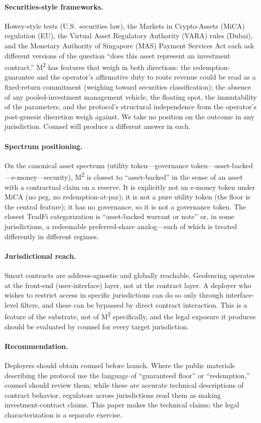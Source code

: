 \paragraph{Securities-style frameworks.} Howey-style tests (U.S.\ securities law), the Markets in Crypto-Assets (MiCA) regulation (EU), the Virtual Asset Regulatory Authority (VARA) rules (Dubai), and the Monetary Authority of Singapore (MAS) Payment Services Act each ask different versions of the question ``does this asset represent an investment contract.'' M\textsuperscript{2} has features that weigh in both directions: the redemption-guarantee and the operator's affirmative duty to route revenue could be read as a fixed-return commitment (weighing toward securities classification); the absence of any pooled-investment management vehicle, the floating spot, the immutability of the parameters, and the protocol's structural independence from the operator's post-genesis discretion weigh against. We take no position on the outcome in any jurisdiction. Counsel will produce a different answer in each.

\paragraph{Spectrum positioning.} On the canonical asset spectrum (utility token---governance token---asset-backed---e-money---security), M\textsuperscript{2} is closest to ``asset-backed'' in the sense of an asset with a contractual claim on a reserve. It is explicitly not an e-money token under MiCA (no peg, no redemption-at-par); it is not a pure utility token (the floor is the central feature); it has no governance, so it is not a governance token. The closest TradFi categorization is ``asset-backed warrant or note'' or, in some jurisdictions, a redeemable preferred-share analog---each of which is treated differently in different regimes.

\paragraph{Jurisdictional reach.} Smart contracts are address-agnostic and globally reachable. Geofencing operates at the front-end (user-interface) layer, not at the contract layer. A deployer who wishes to restrict access in specific jurisdictions can do so only through interface-level filters, and these can be bypassed by direct contract interaction. This is a feature of the substrate, not of M\textsuperscript{2} specifically, and the legal exposure it produces should be evaluated by counsel for every target jurisdiction.

\paragraph{Recommendation.} Deployers should obtain counsel before launch. Where the public materials describing the protocol use the language of ``guaranteed floor'' or ``redemption,'' counsel should review them; while these are accurate technical descriptions of contract behavior, regulators across jurisdictions read them as making investment-contract claims. This paper makes the technical claims; the legal characterization is a separate exercise.

